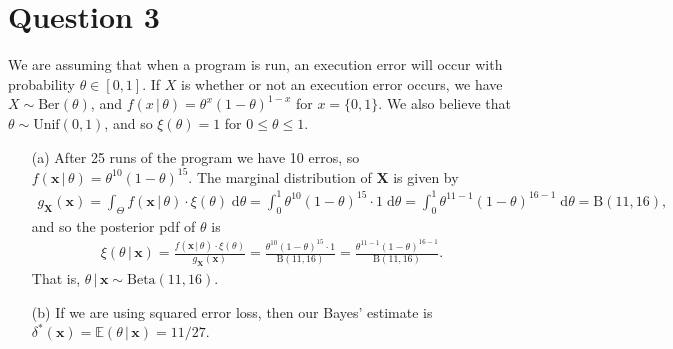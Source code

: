 \documentclass[10pt]{article}
\begin{document}
\section{Question 3} \noindent
We are assuming that when a program is run, an execution error will occur with probability \(\theta \in [0,1]\). If \(X\) is whether or not an execution error
occurs, we have \(X \sim \mathrm{Ber}(\theta)\), and \(f(x \,|\, \theta) = \theta^x (1 - \theta)^{1 - x}\) for \(x = \{0,1\}\). We also believe that 
\(\theta \sim \mathrm{Unif}(0,1)\), and so \(\xi(\theta) = 1\) for \(0 \le \theta \le 1\).
\begin{itemize}
    \item[(a)] After 25 runs of the program we have 10 erros, so \(f(\mathbf{x} \,|\, \theta) = \theta^{10}(1 - \theta)^{15}\). The marginal distribution of 
    \(\bm{X}\) is given by 
    \begin{align*}
        g_{\bm{X}}(\mathbf{x})
        = \int_{\Theta} f(\mathbf{x} \,|\, \theta) \cdot \xi(\theta) \;\mathrm{d}\theta 
        = \int_0^1 \theta^{10} (1 - \theta)^{15} \cdot 1 \;\mathrm{d}\theta
        = \int_0^1 \theta^{11 - 1} (1 - \theta)^{16 - 1} \;\mathrm{d}\theta
        = \mathrm{B}(11, 16),
    \end{align*}
    and so the posterior pdf of \(\theta\) is 
    \begin{align*}
        \xi(\theta \,|\, \mathbf{x})
        = \frac{f(\mathbf{x} \,|\, \theta) \cdot \xi(\theta)}{g_{\bm{X}}(\mathbf{x})}
        = \frac{\theta^{10} (1 - \theta)^{15} \cdot 1}{\mathrm{B}(11, 16)}
        = \frac{\theta^{11 - 1} (1 - \theta)^{16 - 1}}{\mathrm{B}(11, 16)}.
    \end{align*}
    That is, \(\theta \,|\, \mathbf{x} \sim \mathrm{Beta}(11, 16)\). 
    \item[(b)] If we are using squared error loss, then our Bayes' estimate is 
    \(\delta^*(\mathbf{x}) = \mathbb{E}(\theta \,|\, \mathbf{x}) = 11/27\).
\end{itemize}

\end{document}
